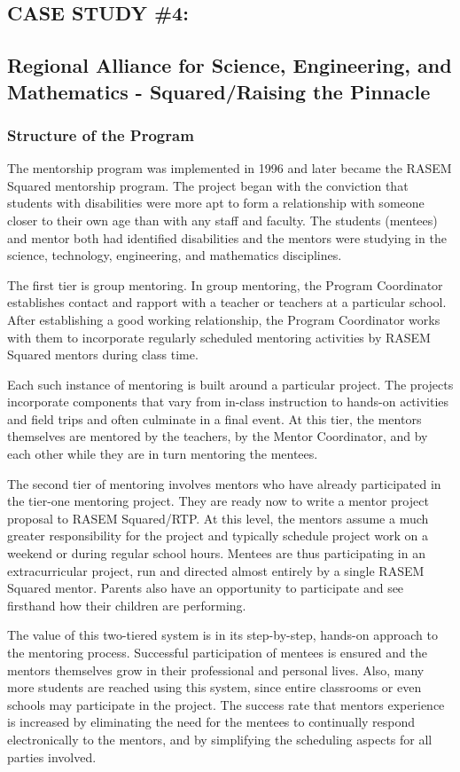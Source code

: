 \documentclass[11.5pt]{sig-alternate} %
\begin{document}
\begin{large}
\section*{CASE STUDY \#4:}
\subsection*{Regional Alliance for Science, Engineering, and Mathematics - Squared/Raising the Pinnacle}
\subsubsection*{Structure of the Program}
The mentorship program was implemented in 1996 and later became the RASEM Squared mentorship program. The project began with the conviction that students with disabilities were more apt to form a relationship with someone closer to their own age than with any staff and faculty. The students (mentees) and mentor both had identified disabilities and the mentors were studying in the science, technology, engineering, and mathematics disciplines.

The first tier is group mentoring. In group mentoring, the Program Coordinator establishes contact and rapport with a teacher or teachers at a particular school. After establishing a good working relationship, the Program Coordinator works with them to incorporate regularly scheduled mentoring activities by RASEM Squared mentors during class time.

Each such instance of mentoring is built around a particular project. The projects incorporate components that vary from in-class instruction to hands-on activities and field trips and often culminate in a final event. At this tier, the mentors themselves are mentored by the teachers, by the Mentor Coordinator, and by each other while they are in turn mentoring the mentees.

The second tier of mentoring involves mentors who have already participated in the tier-one mentoring project. They are ready now to write a mentor project proposal to RASEM Squared/RTP. At this level, the
mentors assume a much greater responsibility for the project and typically schedule project work on a weekend or during regular school hours. Mentees are thus participating in an extracurricular project, run and directed almost entirely by a single RASEM Squared mentor. Parents also have an opportunity to participate and see firsthand how their children are performing.

The value of this two-tiered system is in its step-by-step, hands-on approach to the mentoring process. Successful participation of mentees is ensured and the mentors themselves grow in their professional and personal lives. Also, many more students are reached using this system, since entire classrooms or even schools may participate in the project. The success rate that mentors experience is increased by eliminating the need for the mentees to continually respond electronically to the mentors, and by simplifying the scheduling aspects for all parties involved.


\end{large}
\end{document}
